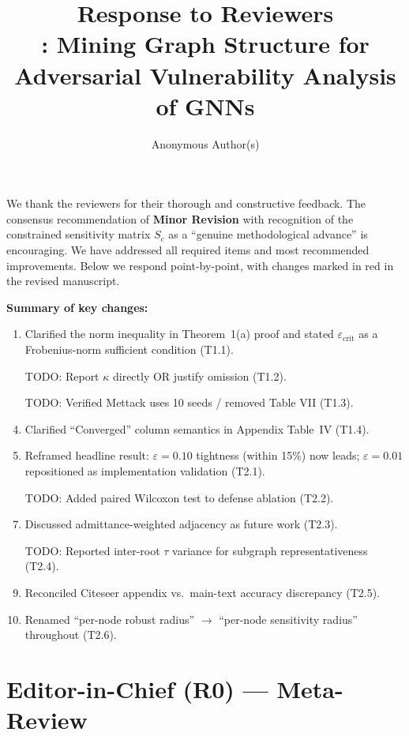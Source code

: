\documentclass[11pt]{article}
\title{Response to Reviewers\\[0.5em]
\large \AEGIS: Mining Graph Structure for Adversarial Vulnerability Analysis of GNNs}
\author{Anonymous Author(s)}
\date{}
\begin{document}
\maketitle

We thank the reviewers for their thorough and constructive feedback. The consensus recommendation of \textbf{Minor Revision} with recognition of the constrained sensitivity matrix $S_c$ as a ``genuine methodological advance'' is encouraging. We have addressed all required items and most recommended improvements. Below we respond point-by-point, with changes marked in \textcolor{changecolor}{red} in the revised manuscript.

\bigskip
\noindent\textbf{Summary of key changes:}
\begin{enumerate}[leftmargin=*]
\item Clarified the norm inequality in Theorem~1(a) proof and stated $\varepsilon_{\mathrm{crit}}$ as a Frobenius-norm sufficient condition (T1.1).
\item [TODO: Report $\kappa$ directly OR justify omission] (T1.2).
\item [TODO: Verified Mettack uses 10 seeds / removed Table VII] (T1.3).
\item Clarified ``Converged'' column semantics in Appendix Table~IV (T1.4).
\item Reframed headline result: $\varepsilon = 0.10$ tightness (within 15\%) now leads; $\varepsilon = 0.01$ repositioned as implementation validation (T2.1).
\item [TODO: Added paired Wilcoxon test to defense ablation] (T2.2).
\item Discussed admittance-weighted adjacency as future work (T2.3).
\item [TODO: Reported inter-root $\tau$ variance for subgraph representativeness] (T2.4).
\item Reconciled Citeseer appendix vs.\ main-text accuracy discrepancy (T2.5).
\item Renamed ``per-node robust radius'' $\to$ ``per-node sensitivity radius'' throughout (T2.6).
\end{enumerate}

\section*{Editor-in-Chief (R0) — Meta-Review}
\end{document}

